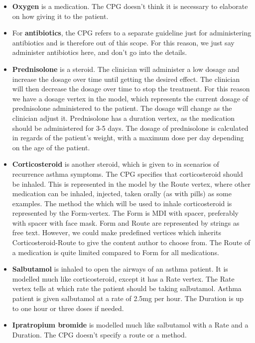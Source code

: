 \begin{itemize}
	\item \textbf{Oxygen} is a medication. The CPG doesn't think it is necessary to elaborate on how giving it to the patient.
	
	\item For \textbf{antibiotics}, the CPG refers to a separate guideline just for administering antibiotics and is therefore out of this scope. For this reason, we just say administer antibiotics here, and don't go into the details.
	
	\item \textbf{Prednisolone} is a steroid. The clinician will administer a low dosage and increase the dosage over time until getting the desired effect. The clinician will then decrease the dosage over time to stop the treatment. For this reason we have a dosage vertex in the model, which represents the current dosage of prednisolone administered to the patient. The dosage will change as the clinician adjust it. Prednisolone has a duration vertex, as the medication should be administered for 3-5 days. The dosage of prednisolone is calculated in regards of the patient's weight, with a maximum dose per day depending on the age of the patient.
	
	\item \textbf{Corticosteroid} is another steroid, which is given to in scenarios of recurrence asthma symptoms. The CPG specifies that corticosteroid should be inhaled. This is represented in the model by the Route vertex, where other medication can be inhaled, injected, taken orally (as with pills) as some examples. The method the which will be used to inhale corticosteroid is represented by the Form-vertex. The Form is MDI with spacer, preferably with spacer with face mask. Form and Route are represented by strings as free text. However, we could make predefined vertices which inherits Corticosteroid-Route to give the content author to choose from. The Route of a medication is quite limited compared to Form for all medications.
	
	\item \textbf{Salbutamol} is inhaled to open the airways of an asthma patient. It is modelled much like corticosteroid, except it has a Rate vertex. The Rate vertex tells at which rate the patient should be taking salbutamol. Asthma patient is given salbutamol at a rate of 2.5mg per hour. The Duration is up to one hour or three doses if needed.
	
	\item \textbf{Ipratropium bromide} is modelled much like salbutamol with a Rate and a Duration. The CPG doesn't specify a route or a method.
\end{itemize}

